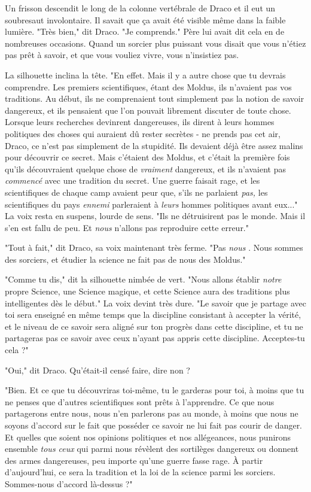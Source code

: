 Un frisson descendit le long de la colonne vertébrale de Draco et il eut un soubresaut involontaire. Il savait que ça avait été visible même dans la faible lumière. "Très bien," dit Draco. "Je comprends." Père lui avait dit cela en de nombreuses occasions. Quand un sorcier plus puissant vous disait que vous n'étiez pas prêt à savoir, et que vous vouliez vivre, vous n'insistiez pas.

La silhouette inclina la tête. "En effet. Mais il y a autre chose que tu devrais comprendre. Les premiers scientifiques, étant des Moldus, ils n'avaient pas vos traditions. Au début, ils ne comprenaient tout simplement pas la notion de savoir dangereux, et ils pensaient que l'on pouvait librement discuter de toute chose. Lorsque leurs recherches devinrent dangereuses, ils dirent à leurs hommes politiques des choses qui auraient dû rester secrètes - ne prends pas cet air, Draco, ce n'est pas simplement de la stupidité. Ils devaient déjà être assez malins pour découvrir ce secret. Mais c'étaient des Moldus, et c'était la première fois qu'ils découvraient quelque chose de \emph{vraiment}  dangereux, et ils n'avaient pas \emph{commencé}  avec une tradition du secret. Une guerre faisait rage, et les scientifiques de chaque camp avaient peur que, s'ils ne parlaient \emph{pas,}  les scientifiques du pays \emph{ennemi } parleraient à \emph{leurs}  hommes politiques avant eux..." La voix resta en suspens, lourde de sens. "Ils ne détruisirent pas le monde. Mais il s'en est fallu de peu. Et \emph{nous } n'allons pas reproduire cette erreur."

"Tout à fait," dit Draco, sa voix maintenant très ferme. "Pas \emph{nous} . Nous sommes des sorciers, et étudier la science ne fait pas de nous des Moldus."

"Comme tu dis," dit la silhouette nimbée de vert. "Nous allons établir \emph{notre}  propre Science, une Science magique, et cette Science aura des traditions plus intelligentes dès le début." La voix devint très dure. "Le savoir que je partage avec toi sera enseigné en même temps que la discipline consistant à accepter la vérité, et le niveau de ce savoir sera aligné sur ton progrès dans cette discipline, et tu ne partageras pas ce savoir avec ceux n'ayant pas appris cette discipline. Acceptes-tu cela ?"

"Oui," dit Draco. Qu'était-il censé faire, dire non ?

"Bien. Et ce que tu découvriras toi-même, tu le garderas pour toi, à moins que tu ne penses que d'autres scientifiques sont prêts à l'apprendre. Ce que nous partagerons entre nous, nous n'en parlerons pas au monde, à moins que nous ne soyons d'accord sur le fait que posséder ce savoir ne lui fait pas courir de danger. Et quelles que soient nos opinions politiques et nos allégeances, nous punirons ensemble \emph{tous ceux}  qui parmi nous révèlent des sortilèges dangereux ou donnent des armes dangereuses, peu importe qu'une guerre fasse rage. À partir d'aujourd'hui, ce sera la tradition et la loi de la science parmi les sorciers. Sommes-nous d'accord là-dessus ?"

